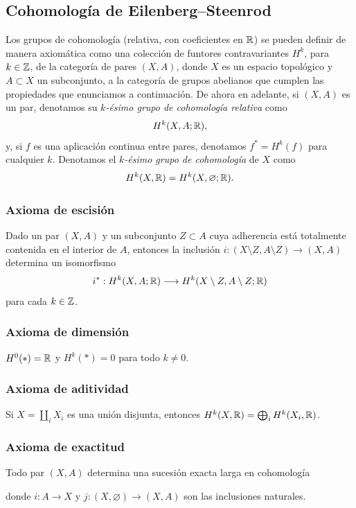 \documentclass[11pt,a4paper]{amsbook}
\theoremstyle{remark} \newtheorem{rmk}[subsection]{Observación}
\theoremstyle{definition} \newtheorem{defn}[subsection]{Definición}
\theoremstyle{definition} \newtheorem{ex}[subsection]{Ejemplo}
\theoremstyle{definition} \newtheorem{ej}[subsection]{Ejercicio}
\begin{document}
\subsection{Cohomología de Eilenberg--Steenrod} Los grupos de cohomología (relativa, con coeficientes en $\mathbb R$) se pueden definir de manera axiomática como una colección de funtores contravariantes $H^k$, para $k\in \mathbb Z$, de la categoría de pares $(X,A)$, donde $X$ es un espacio topológico y $A\subset X$ un subconjunto, a la categoría de grupos abelianos que cumplen las propiedades que enunciamos a continuación. De ahora en adelante, si $(X,A)$ es un par, denotamos su \emph{$k$-ésimo grupo de cohomología relativa} como
\begin{equation*}
H^k(X,A;\mathbb R),
\end{equation*}
y, si $f$ es una aplicación continua entre pares, denotamos $f^*=H^k(f)$ para cualquier $k$. Denotamos el \emph{$k$-ésimo grupo de cohomología} de $X$ como
\begin{equation*}
H^k(X,\mathbb R) = H^k(X,\varnothing;\mathbb R).
\end{equation*}

\subsubsection{Axioma de escisión} Dado un par $(X,A)$ y un subconjunto $Z\subset A$ cuya adherencia está totalmente contenida en el interior de $A$, entonces la inclusión $i:(X\setminus Z, A\setminus Z) \rightarrow (X,A)$ determina un isomorfismo
\begin{equation*}
i^*: H^k(X,A;\mathbb R) \longrightarrow H^k(X\setminus Z,A\setminus Z;\mathbb R)
\end{equation*}
para cada $k\in \mathbb Z$.

\subsubsection{Axioma de dimensión} $H^0(*)=\mathbb R$ y $H^k(*)=0$ para todo $k\neq 0$.

\subsubsection{Axioma de aditividad} Si $X=\coprod_i X_i$ es una unión disjunta, entonces $H^k(X,\mathbb R)=\bigoplus_i H^k(X_i,\mathbb R)$.

\subsubsection{Axioma de exactitud} Todo par $(X,A)$ determina una sucesión exacta larga en cohomología
\begin{center}
\end{center}
donde $i:A\rightarrow X$ y $j:(X,\varnothing)\rightarrow (X,A)$ son las inclusiones naturales.
\end{document}
